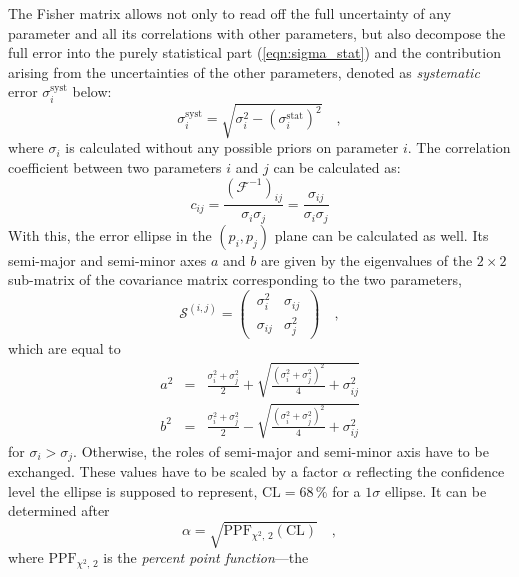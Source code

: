The Fisher matrix allows not only to read off the full uncertainty of any
parameter and all its correlations with other parameters, but also decompose the
full error into the purely statistical part (\ref{eqn:sigma_stat}) and the
contribution arising from the uncertainties of the other parameters, denoted as
\emph{systematic} error $\sigma_i^\mathrm{syst}$ below:
\begin{equation}
 \sigma^\mathrm{syst}_i =
         \sqrt{\sigma_i^2 - \left(\sigma^\mathrm{stat}_i\right)^2}\quad,
 \label{eqn:syst_error}
\end{equation}
where $\sigma_i$ is calculated without any possible priors on
parameter $i$. The correlation coefficient between two parameters $i$ and $j$
can be calculated as:
\begin{equation}
 c_{ij}
   = \frac{\left(\mathcal{F}^{-1}\right)_{ij}}{\sigma_i \sigma_j}
   = \frac{\sigma_{ij}}{\sigma_i \sigma_j}
 \label{eqn:corr_coeff}
\end{equation}
With this, the error ellipse in the $(p_i,p_j)$ plane can be calculated as
well. Its semi-major and semi-minor axes $a$ and $b$ are given by the
eigenvalues of the $2\times 2$ sub-matrix of the covariance matrix corresponding
to the two parameters,
\begin{equation}
 \mathcal{S}^{(i,j)} =
 \begin{pmatrix}
  \,\sigma_i^2 & \sigma_{ij}\, \\
  \,\sigma_{ij} & \sigma_j^2\,
 \end{pmatrix} \quad,
 \label{eqn:cov_submatrix}
\end{equation}
which are equal to \cite{Fisher_ellipse}
\begin{eqnarray}
 a^2 &=& \frac{\sigma_i^2 + \sigma_j^2}{2} +
         \sqrt{\frac{\left(\sigma_i^2+\sigma_j^2\right)^2}{4}+\sigma_{ij}^2} \\
 b^2 &=& \frac{\sigma_i^2 + \sigma_j^2}{2} -
         \sqrt{\frac{\left(\sigma_i^2+\sigma_j^2\right)^2}{4} + \sigma_{ij}^2} 
\end{eqnarray}
for $\sigma_i > \sigma_j$. Otherwise, the roles of semi-major and semi-minor
axis have to be exchanged. These values have to be scaled by a factor $\alpha$
reflecting the confidence level the ellipse is supposed to represent, \eg
$\mathrm{CL} = 68\,\%$ for a $1\sigma$ ellipse. It can be determined after
\begin{equation}
 \alpha = \sqrt{\mathrm{PPF}_{\chi^2,\,2}(\mathrm{CL})} \quad,
\end{equation}
where $\mathrm{PPF}_{\chi^2,\,2}$ is the \emph{percent point function}---the
